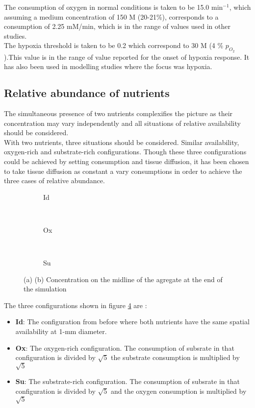 \documentclass[11pt,a4paper]{article}
\begin{document}
The consumption of oxygen in normal conditions is taken to be 15.0 min$^{-1}$, which assuming a medium concentration of 150 \textmu M (20-21\%), corresponds to a consumption of 2.25 mM/min, which is in the range of values used in other studies.\cite{Kempf2005}\cite{Mao2018} \\

The hypoxia threshold is taken to be 0.2 which correspond to 30 \textmu M (4 \% $p_{O_{2}}$).This value is in the range of value reported for the onset of hypoxia response.\cite{McKeown2014}\cite{Saxena2019} It has also been used in modelling studies where the focus was hypoxia.\cite{Bull2020}\cite{Kempf2015}

\subsection{Relative abundance of nutrients}
The simultaneous presence of two nutrients complexifies the picture as their concentration may vary independently and all situations of relative availability should be considered.\\

With two nutrients, three situations should be considered. Similar availability, oxygen-rich and substrate-rich configurations. Though these three configurations could be achieved by setting consumption and tissue diffusion, it has been chosen to take tissue diffusion as constant a vary consumptions in order to achieve the three cases of relative abundance.\\

\begin{figure}[ht!]
\begin{subfigure}{0.32\textwidth}
	\centering
	
	\caption{Id \label{ref_mid_Id}}
\end{subfigure}
~
\begin{subfigure}{0.32\textwidth}
	\centering
	
	\caption{ Ox \label{ref_mid_Gl}}
\end{subfigure}
~
\begin{subfigure}{0.32\textwidth}
	\centering
	
	\caption{Su \label{ref_mid_Ox}}
\end{subfigure}
\caption{(a)  (b) Concentration on the midline of the agregate at the end of the simulation \label{ref_mid}}
\end{figure}

The three configurations shown in figure \ref{ref_mid} are : 
\begin{itemize}
\item \textbf{Id}: The configuration from before where both nutrients have the same spatial availability at 1-mm diameter.
\item \textbf{Ox}: The oxygen-rich configuration. The consumption of subsrate in that configuration is divided by $\sqrt{5}$ the substrate consumption is multiplied by $\sqrt{5}$
\item \textbf{Su}: The substrate-rich configuration. The consumption of subsrate in that configuration is divided by $\sqrt{5}$ and the oxygen consumption is multiplied by $\sqrt{5}$

\end{itemize}
\end{document}
